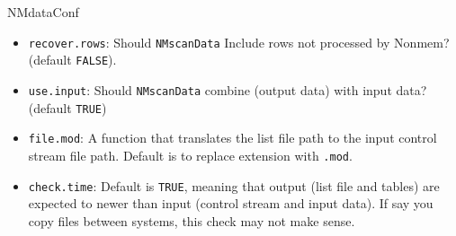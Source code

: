 \documentclass[
  8pt,
  ignorenonframetext,
  aspectratio=169]{beamer}
\begin{document}
\begin{frame}[fragile]{NMdataConf}
\begin{itemize}
\item
  \texttt{recover.rows}: Should \texttt{NMscanData} Include rows not
  processed by Nonmem? (default \texttt{FALSE}).
\item
  \texttt{use.input}: Should \texttt{NMscanData} combine (output data)
  with input data? (default \texttt{TRUE})
\item
  \texttt{file.mod}: A function that translates the list file path to
  the input control stream file path. Default is to replace extension
  with \texttt{.mod}.
\item
  \texttt{check.time}: Default is \texttt{TRUE}, meaning that output
  (list file and tables) are expected to newer than input (control
  stream and input data). If say you copy files between systems, this
  check may not make sense.
\end{itemize}
\end{frame}
\end{document}
